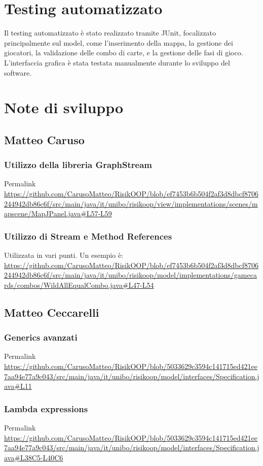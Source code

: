 \documentclass[a4paper,12pt]{report}
\begin{document}
\section{Testing automatizzato}
Il testing automatizzato è stato realizzato tramite JUnit, focalizzato principalmente sul model, come l'inserimento della mappa, la gestione dei giocatori, la validazione delle combo di carte, e la gestione delle fasi di gioco.
L'interfaccia grafica è stata testata manualmente durante lo sviluppo del software.

\section{Note di sviluppo}
\subsection{Matteo Caruso}
\subsubsection{Utilizzo della libreria GraphStream}
Permalink \url{https://github.com/CarusoMatteo/RisikOOP/blob/ef7453b6b504f2af3d8dbcf8706244942db86c6f/src/main/java/it/unibo/risikoop/view/implementations/scenes/mapscene/MapJPanel.java#L57-L59}
\subsubsection{Utilizzo di Stream e Method References}
Utilizzata in vari punti. Un esempio è: \url{https://github.com/CarusoMatteo/RisikOOP/blob/ef7453b6b504f2af3d8dbcf8706244942db86c6f/src/main/java/it/unibo/risikoop/model/implementations/gamecards/combos/WildAllEqualCombo.java#L47-L54}

\subsection{Matteo Ceccarelli}
\subsubsection{Generics avanzati}
Permalink \url{https://github.com/CarusoMatteo/RisikOOP/blob/5033629c3594c141715ed421ee7aa94e77a9c043/src/main/java/it/unibo/risikoop/model/interfaces/Specification.java#L11}

\subsubsection{Lambda expressions}
Permalink \url{https://github.com/CarusoMatteo/RisikOOP/blob/5033629c3594c141715ed421ee7aa94e77a9c043/src/main/java/it/unibo/risikoop/model/interfaces/Specification.java#L38C5-L40C6}
\end{document}
